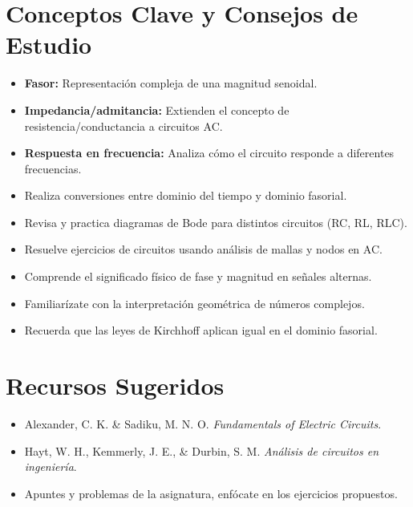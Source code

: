\documentclass[12pt]{article}
\begin{document}
\vspace{0.5cm}
\section*{Conceptos Clave y Consejos de Estudio}

\begin{itemize}
    \item \textbf{Fasor:} Representación compleja de una magnitud senoidal.
    \item \textbf{Impedancia/admitancia:} Extienden el concepto de resistencia/conductancia a circuitos AC.
    \item \textbf{Respuesta en frecuencia:} Analiza cómo el circuito responde a diferentes frecuencias.
    \item Realiza conversiones entre dominio del tiempo y dominio fasorial.
    \item Revisa y practica diagramas de Bode para distintos circuitos (RC, RL, RLC).
    \item Resuelve ejercicios de circuitos usando análisis de mallas y nodos en AC.
    \item Comprende el significado físico de fase y magnitud en señales alternas.
    \item Familiarízate con la interpretación geométrica de números complejos.
    \item Recuerda que las leyes de Kirchhoff aplican igual en el dominio fasorial.
\end{itemize}

\section*{Recursos Sugeridos}
\begin{itemize}
    \item Alexander, C. K. \& Sadiku, M. N. O. \textit{Fundamentals of Electric Circuits}.
    \item Hayt, W. H., Kemmerly, J. E., \& Durbin, S. M. \textit{Análisis de circuitos en ingeniería}.
    \item Apuntes y problemas de la asignatura, enfócate en los ejercicios propuestos.
\end{itemize}
\end{document}

